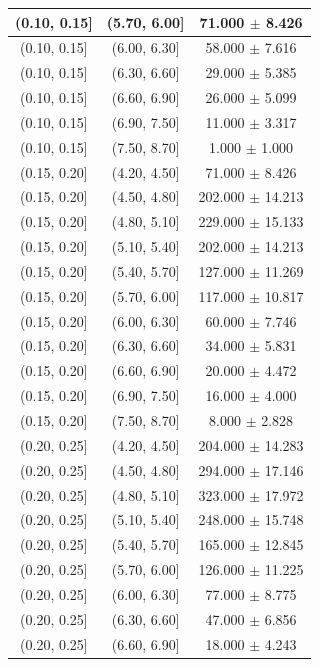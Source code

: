 \begin{longtable}{|c|c|c|}
\hline
(0.10, 0.15] & (5.70, 6.00] & 71.000 $\pm$ 8.426 \\ 
\hline
(0.10, 0.15] & (6.00, 6.30] & 58.000 $\pm$ 7.616 \\ 
\hline
(0.10, 0.15] & (6.30, 6.60] & 29.000 $\pm$ 5.385 \\ 
\hline
(0.10, 0.15] & (6.60, 6.90] & 26.000 $\pm$ 5.099 \\ 
\hline
(0.10, 0.15] & (6.90, 7.50] & 11.000 $\pm$ 3.317 \\ 
\hline
(0.10, 0.15] & (7.50, 8.70] & 1.000 $\pm$ 1.000 \\ 
\hline
(0.15, 0.20] & (4.20, 4.50] & 71.000 $\pm$ 8.426 \\ 
\hline
(0.15, 0.20] & (4.50, 4.80] & 202.000 $\pm$ 14.213 \\ 
\hline
(0.15, 0.20] & (4.80, 5.10] & 229.000 $\pm$ 15.133 \\ 
\hline
(0.15, 0.20] & (5.10, 5.40] & 202.000 $\pm$ 14.213 \\ 
\hline
(0.15, 0.20] & (5.40, 5.70] & 127.000 $\pm$ 11.269 \\ 
\hline
(0.15, 0.20] & (5.70, 6.00] & 117.000 $\pm$ 10.817 \\ 
\hline
(0.15, 0.20] & (6.00, 6.30] & 60.000 $\pm$ 7.746 \\ 
\hline
(0.15, 0.20] & (6.30, 6.60] & 34.000 $\pm$ 5.831 \\ 
\hline
(0.15, 0.20] & (6.60, 6.90] & 20.000 $\pm$ 4.472 \\ 
\hline
(0.15, 0.20] & (6.90, 7.50] & 16.000 $\pm$ 4.000 \\ 
\hline
(0.15, 0.20] & (7.50, 8.70] & 8.000 $\pm$ 2.828 \\ 
\hline
(0.20, 0.25] & (4.20, 4.50] & 204.000 $\pm$ 14.283 \\ 
\hline
(0.20, 0.25] & (4.50, 4.80] & 294.000 $\pm$ 17.146 \\ 
\hline
(0.20, 0.25] & (4.80, 5.10] & 323.000 $\pm$ 17.972 \\ 
\hline
(0.20, 0.25] & (5.10, 5.40] & 248.000 $\pm$ 15.748 \\ 
\hline
(0.20, 0.25] & (5.40, 5.70] & 165.000 $\pm$ 12.845 \\ 
\hline
(0.20, 0.25] & (5.70, 6.00] & 126.000 $\pm$ 11.225 \\ 
\hline
(0.20, 0.25] & (6.00, 6.30] & 77.000 $\pm$ 8.775 \\ 
\hline
(0.20, 0.25] & (6.30, 6.60] & 47.000 $\pm$ 6.856 \\ 
\hline
(0.20, 0.25] & (6.60, 6.90] & 18.000 $\pm$ 4.243 \\ 

\end{longtable}
